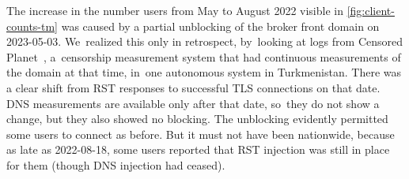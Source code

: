 \documentclass[letterpaper,twocolumn]{article}
\begin{document}
The increase in the number users from May to August 2022
visible in \autoref{fig:client-counts-tm} was caused by
a partial unblocking of the broker front domain on \mbox{2023-05-03}.
We~realized this only in retrospect,
by~looking at logs from Censored Planet~\cite{Raman2020c},
a~censorship measurement system that had continuous measurements
of the domain at that time, in~one autonomous system in Turkmenistan.
There was a clear shift from RST responses to successful TLS connections on that date.
DNS measurements are available only after that date,
so~they do not show a change, but they also showed no blocking.
The unblocking evidently permitted some users to connect as before.
But it must not have been nationwide, because as late as \mbox{2022-08-18},
some users reported that RST injection was still in place for them
(though DNS injection had ceased).

\end{document}
